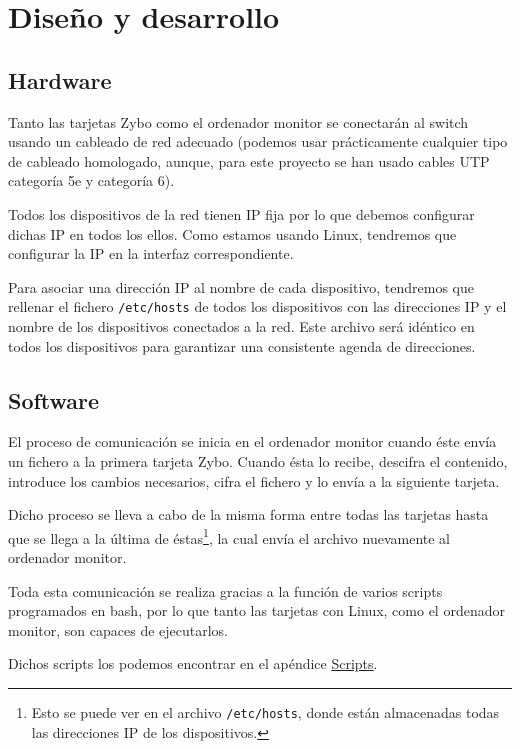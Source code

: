 \section{Diseño y desarrollo}
\subsection{Hardware}
Tanto las tarjetas Zybo como el ordenador monitor se conectarán al switch usando un cableado de red adecuado (podemos usar prácticamente cualquier tipo de cableado homologado, aunque, para este proyecto se han usado cables UTP categoría 5e y categoría 6).

Todos los dispositivos de la red tienen IP fija por lo que debemos configurar dichas IP en todos los ellos. Como estamos usando Linux, tendremos que configurar la IP en la interfaz correspondiente.

Para asociar una dirección IP al nombre de cada dispositivo, tendremos que rellenar el fichero \texttt{/etc/hosts} de todos los dispositivos con las direcciones IP y el nombre de los dispositivos conectados a la red. Este archivo será idéntico en todos los dispositivos para garantizar una consistente agenda de direcciones.

\subsection{Software}
El proceso de comunicación se inicia en el ordenador monitor cuando éste envía un fichero a la primera tarjeta Zybo. Cuando ésta lo recibe, descifra el contenido, introduce los cambios necesarios, cifra el fichero y lo envía a la siguiente tarjeta.

Dicho proceso se lleva a cabo de la misma forma entre todas las tarjetas hasta que se llega a la última de éstas\footnote{Esto se puede ver en el archivo \texttt{/etc/hosts}, donde están almacenadas todas las direcciones IP de los dispositivos.}, la cual envía el archivo nuevamente al ordenador monitor.

Toda esta comunicación se realiza gracias a la función de varios scripts programados en bash, por lo que tanto las tarjetas con Linux, como el ordenador monitor, son capaces de ejecutarlos.

Dichos scripts los podemos encontrar en el apéndice \hyperlink{Scripts}{Scripts}.
